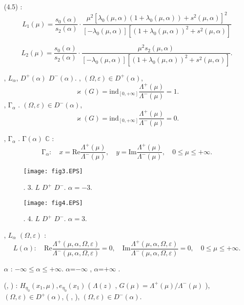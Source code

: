 \documentclass[12pt, a4paper]{article}
\begin{document}
 (4.5)  :
$$
L_1(\mu)=\frac{s_0(\alpha)}{s_2(\alpha)} \cdot
\frac{\mu^2[\lambda_0(\mu,\alpha)(1+\lambda_0(\mu,\alpha))+s^2(\mu,\alpha)]^2}
{[-\lambda_0(\mu,\alpha)][(1+\lambda_0(\mu,\alpha))^2+s^2(\mu,\alpha)]}
$$

$$
L_2(\mu)=\frac{s_0(\alpha)}{s_2(\alpha)} \cdot \frac{\mu^2s_2(\mu,\alpha)}
{[-\lambda_0(\mu,\alpha)][(1+\lambda_0(\mu,\alpha))^2+s^2(\mu,\alpha)]}.
$$

,    $L_\alpha$,    $D^+(\alpha)$ 
$D^-(\alpha)$.
,   $(\Omega,\varepsilon)\in D^+(\alpha)$, 
$$
\varkappa(G)=\mathrm{ind}_{[0,+\infty]}\frac{\Lambda^+(\mu)}{\Lambda^-(\mu)}=1.
$$
 ,   $\mathrm\Gamma_\alpha$     .
  $(\Omega,\varepsilon)\in D^-(\alpha)$, 
$$
\varkappa(G)=\mathrm{ind}_{[0,+\infty]}\frac{\Lambda^+(\mu)}{\Lambda^-(\mu)}=0.
$$

 ,   $\mathrm\Gamma_\alpha$    .
 $\mathrm\Gamma(\alpha)$    $\mathbb C$  :
$$
\mathrm\Gamma_\alpha: \quad x=\mathrm{Re}\frac{\Lambda^+(\mu)}
{\Lambda^-(\mu)}, \quad y=\mathrm{Im}\frac{\Lambda^+(\mu)}
{\Lambda^-(\mu)}, \quad 0\leqslant\mu\leqslant+\infty.
$$


\begin{figure}
\begin{center}
\texttt{[image: fig3.EPS]}
\end{center}
\begin{center}
{. 3.  $L$   $D^+$  $D^-$.  $\alpha=-3$.}
\end{center}
\begin{center}
\texttt{[image: fig4.EPS]}
\end{center}
\begin{center}
{. 4.  $L$   $D^+$  $D^-$.  $\alpha=3$.}
\end{center}
\end{figure}

\clearpage

,   $L_\alpha$    $(\Omega,\varepsilon)$
  :
$$
L(\alpha): \quad \mathrm{Re}\frac{\Lambda^+(\mu,\alpha,\Omega,\varepsilon)}
{\Lambda^-(\mu,\alpha,\Omega,\varepsilon)}=0, \quad
\mathrm{Im}\frac{\Lambda^+(\mu,\alpha,\Omega,\varepsilon)}
{\Lambda^-(\mu,\alpha,\Omega,\varepsilon)}=0, \quad 0\leqslant\mu\leqslant+\infty.
$$


    $\alpha$    
  : $-\infty\leqslant\alpha\leqslant+\infty$.
   $\alpha$=$-\infty$   ,  
$\alpha$=$+\infty$    .

     (,  ) :
  $H_{\eta_0}(x_1,\mu), e_{\eta_0}(x_1)$  (%
     $\Lambda(z)$  ,   
$G(\mu)=\Lambda^+(\mu)/\Lambda^-(\mu)$     ), 
$(\Omega,\varepsilon)\in D^+(\alpha)$,     ( 
    ,      
 ),  $(\Omega,\varepsilon)\in D^-(\alpha)$.
\end{document}
